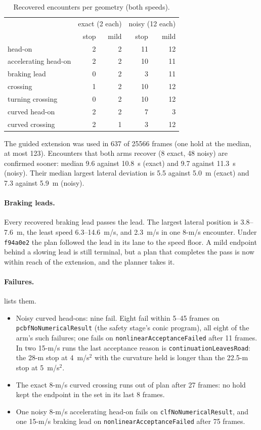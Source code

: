 \documentclass[11pt]{article}
\begin{document}
\begin{table}[h]
\centering\small
\caption{Recovered encounters per geometry (both speeds).}
\begin{tabular}{lrrrr}
\toprule
 & \multicolumn{2}{c}{exact (2 each)} & \multicolumn{2}{c}{noisy (12 each)}\\
 & stop & mild & stop & mild\\
\midrule
head-on & 2 & 2 & 11 & 12\\
accelerating head-on & 2 & 2 & 10 & 11\\
braking lead & 0 & 2 & 3 & 11\\
crossing & 1 & 2 & 10 & 12\\
turning crossing & 0 & 2 & 10 & 12\\
curved head-on & 2 & 2 & 7 & 3\\
curved crossing & 2 & 1 & 3 & 12\\
\bottomrule
\end{tabular}
\end{table}

The guided extension was used in 637 of 25566 frames (one hold at the
median, at most 123). Encounters that both arms recover (8 exact, 48 noisy)
are confirmed sooner: median 9.6 against 10.8~s (exact) and 9.7 against
11.3~s (noisy). Their median largest lateral deviation is 5.5 against
5.0~m (exact) and 7.3 against 5.9~m (noisy).

\paragraph{Braking leads.}
Every recovered braking lead passes the lead. The largest lateral position
is 3.8--7.6~m, the least speed 6.3--14.6~m/s, and 2.3~m/s in one 8-m/s
encounter. Under \texttt{f94a0e2} the plan followed the lead in its lane to
the speed floor. A mild endpoint behind a slowing lead is still terminal,
but a plan that completes the pass is now within reach of the extension, and
the planner takes it.

\paragraph{Failures.}
 lists them.
\begin{itemize}
\item Noisy curved head-ons: nine fail. Eight fail within 5--45 frames on
  \texttt{pcbfNoNumericalResult} (the safety stage's conic program), all
  eight of the arm's such failures; one fails on
  \texttt{nonlinearAcceptanceFailed} after 11 frames. In two 15-m/s runs the
  last acceptance reason is \texttt{continuationLeavesRoad}: the 28-m stop at
  4~m/s$^2$ with the curvature held is longer than the 22.5-m stop at
  5~m/s$^2$.
\item The exact 8-m/s curved crossing runs out of plan after 27 frames: no
  hold kept the endpoint in the set in its last 8 frames.
\item One noisy 8-m/s accelerating head-on fails on
  \texttt{clfNoNumericalResult}, and one 15-m/s braking lead on
  \texttt{nonlinearAcceptanceFailed} after 75 frames.
\end{itemize}
\end{document}
